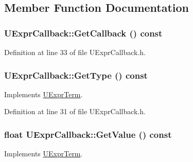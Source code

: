 \subsection{Member Function Documentation}
\hypertarget{class_u_expr_callback_c99164cc38dc11ed0a70d80b52619131}{
\subsubsection[{GetCallback}]{ UExprCallback::GetCallback () const}}
\label{class_u_expr_callback_c99164cc38dc11ed0a70d80b52619131}




Definition at line 33 of file UExprCallback.h.\hypertarget{class_u_expr_callback_231e95e9e737d1ecfa27c5bb6a660be8}{
\subsubsection[{GetType}]{ UExprCallback::GetType () const}}
\label{class_u_expr_callback_231e95e9e737d1ecfa27c5bb6a660be8}




Implements \hyperlink{class_u_expr_term_fc66ae4dfe6a112d107183840d753562}{UExprTerm}.

Definition at line 31 of file UExprCallback.h.\hypertarget{class_u_expr_callback_22d3eb12a6a7176ba982a4b6b7c56029}{
\subsubsection[{GetValue}]{\setlength{\rightskip}{0pt plus 5cm}float UExprCallback::GetValue () const}}
\label{class_u_expr_callback_22d3eb12a6a7176ba982a4b6b7c56029}




Implements \hyperlink{class_u_expr_term_85274403764fb0e4cc701a0374fd6592}{UExprTerm}.

